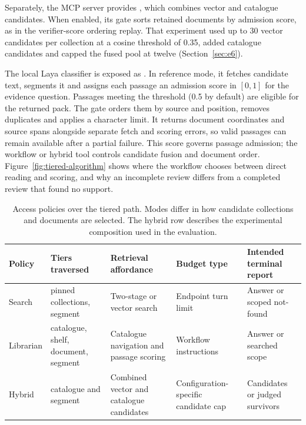 Separately, the MCP server provides , which combines
vector and catalogue candidates. When enabled, its gate sorts retained
documents by admission score, as in the verifier-score ordering replay. That
experiment used up to 30 vector candidates per collection at a cosine
threshold of 0.35, added catalogue candidates and capped the fused pool at
twelve (Section~\ref{sec:e6}).

The local Laya classifier \cite{laya} is exposed as
. In reference mode, it fetches candidate text, segments
it and assigns each passage an admission score in $[0,1]$ for the evidence
question. Passages meeting the threshold (0.5 by default) are eligible for
the returned pack. The gate orders them by source and position, removes
duplicates and applies a character limit. It returns document coordinates
and source spans alongside separate fetch and scoring errors, so valid
passages can remain available after a partial failure. This score governs
passage admission; the workflow or hybrid tool controls candidate fusion
and document order. Figure~\ref{fig:tiered-algorithm} shows where the
workflow chooses between direct reading and scoring, and why an incomplete
review differs from a completed review that found no support.

\begin{table}[t]
\centering
\small
\setlength{\tabcolsep}{5pt}
\caption{Access policies over the tiered path. Modes differ in how candidate collections and documents are selected.
The hybrid row describes the experimental composition used in the evaluation.}
\label{tab:lanes}
\begin{tabular}{@{}>{\raggedright\arraybackslash}p{}>{\raggedright\arraybackslash}p{}>{\raggedright\arraybackslash}p{}>{\raggedright\arraybackslash}p{}>{\raggedright\arraybackslash}p{}@{}}
\toprule
Policy & Tiers traversed & Retrieval affordance & Budget type & Intended terminal report\\
\midrule
Search & pinned collections, segment & Two-stage or vector search & Endpoint turn limit & Answer or scoped not-found\\
Librarian & catalogue, shelf, document, segment & Catalogue navigation and passage scoring & Workflow instructions & Answer or searched scope\\
Hybrid & catalogue and segment & Combined vector and catalogue candidates & Configuration-specific candidate cap & Candidates or judged survivors\\
\bottomrule
\end{tabular}
\end{table}

